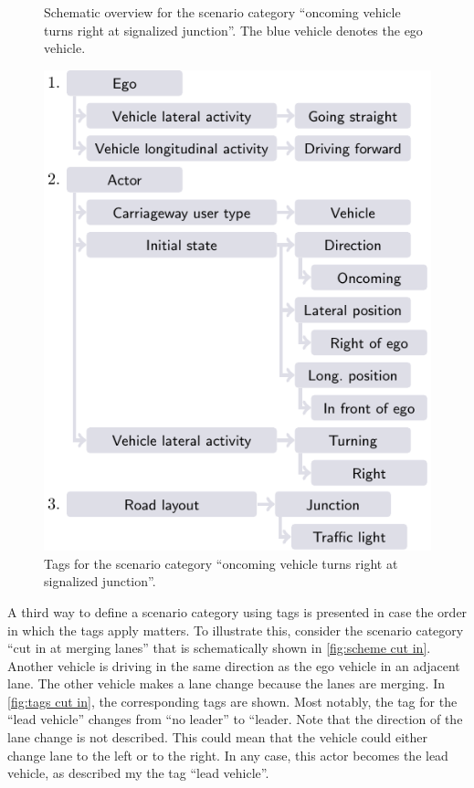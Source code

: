 \setlength{\figurewidth}{15.0em}
\begin{figure}
	\centering
	
	\caption{Schematic overview for the scenario category ``oncoming vehicle turns right at signalized junction''. The blue vehicle denotes the ego vehicle.}
	\label{fig:scheme oncoming turning}
\end{figure}
\begin{figure}
	\centering
	\includegraphics{figures/oncoming_turning}
	\caption{Tags for the scenario category ``oncoming vehicle turns right at signalized junction''.}
	\label{fig:tags oncoming turning}
\end{figure}

A third way to define a scenario category using tags is presented in case the order in which the tags apply matters. To illustrate this, consider the scenario category ``cut in at merging lanes'' that is schematically shown in \cref{fig:scheme cut in}. 
Another vehicle is driving in the same direction as the ego vehicle in an adjacent lane. The other vehicle makes a lane change because the lanes are merging. In \cref{fig:tags cut in}, the corresponding tags are shown. Most notably, the tag for the ``lead vehicle'' changes from ``no leader'' to ``leader. Note that the direction of the lane change is not described. This could mean that the vehicle could either change lane to the left or to the right. In any case, this actor becomes the lead vehicle, as described my the tag ``lead vehicle''. 

